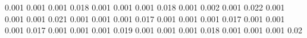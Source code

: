 0.001      0.001      %
0.001      0.018      %
0.001      0.001      %
0.001      0.018      %
0.001      0.002      %
0.001      0.022      %
0.001      0.001      %
0.001      0.021      %
0.001      0.001      %
0.001      0.017      %
0.001      0.001      %
0.001      0.017      %
0.001      0.001      %
0.001      0.017      %
0.001      0.001      %
0.001      0.019      %
0.001      0.001      %
0.001      0.018      %
0.001      0.001      %
0.001      0.02       %
